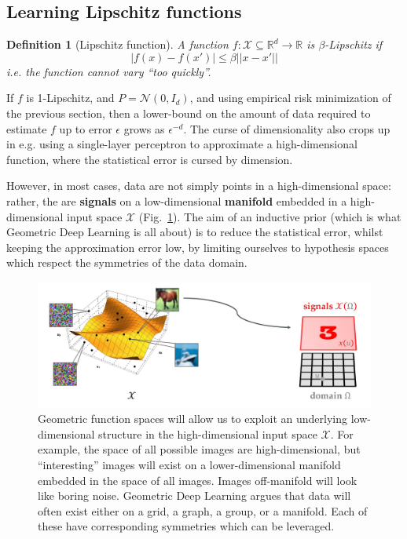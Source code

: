 \documentclass[11pt]{article}
\numberwithin{equation}{section}
\newtheorem{defn}{Definition}[section]
\begin{document}
\subsection{Learning Lipschitz functions}
\begin{defn}[Lipschitz function]
A function $f: \mathcal{X} \subseteq \mathbb{R}^d \rightarrow \mathbb{R}$ is $\beta$-Lipschitz if 
\begin{equation}
|f(x)-f(x')| \leq \beta ||x-x'||
\end{equation}
i.e. the function cannot vary ``too quickly''. 
\end{defn}
If $f$ is 1-Lipschitz, and $P=\mathcal{N}(0, I_d)$, and using empirical risk minimization of the previous section, then a lower-bound on the amount of data required to estimate $f$ up to error $\epsilon$ grows as $\epsilon^{-d}$. The curse of dimensionality also crops up in e.g. using a single-layer perceptron to approximate a high-dimensional function, where the statistical error is cursed by dimension. 

However, in most cases, data are not simply points in a high-dimensional space: rather, the are \textbf{signals} on a low-dimensional \textbf{manifold} embedded in a high-dimensional input space $\mathcal{X}$ (Fig.~\ref{fig:geom-func-spaces}). The aim of an inductive prior (which is what Geometric Deep Learning is all about) is to reduce the statistical error, whilst keeping the approximation error low, by limiting ourselves to hypothesis spaces which respect the symmetries of the data domain.

\begin{figure}
\begin{center}
\includegraphics[width=0.8\columnwidth]{../figures/geometric-function-spaces.jpg}  
\end{center}
\caption{Geometric function spaces will allow us to exploit an underlying low-dimensional structure in the high-dimensional input space $\mathcal{X}$. For example, the space of all possible images are high-dimensional, but ``interesting'' images will exist on a lower-dimensional manifold embedded in the space of all images. Images off-manifold will look like boring noise. Geometric Deep Learning argues that data will often exist either on a grid, a graph, a group, or a manifold. Each of these have corresponding symmetries which can be leveraged.
}
\label{fig:geom-func-spaces}
\end{figure}

\newpage
 
\end{document}

